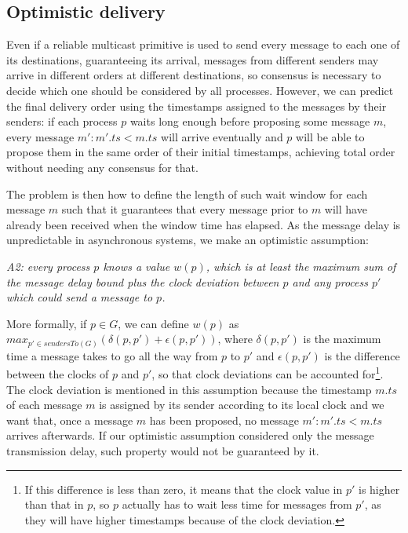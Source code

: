\documentclass[times, 10pt]{article}
\begin{document}
\subsection{Optimistic delivery}
\label{sec:optdel}

Even if a reliable multicast primitive is used to send every message to each one of its destinations, guaranteeing its arrival, messages from different senders may arrive in different orders at different destinations, so consensus is necessary to decide which one should be considered by all processes. However, we can predict the final delivery order using the timestamps assigned to the messages by their senders: if each process $p$ waits long enough before proposing some message $m$, every message $m' : m'.ts < m.ts$ will arrive eventually and $p$ will be able to propose them in the same order of their initial timestamps, achieving total order without needing any consensus for that.

The problem is then how to define the length of such wait window for each message $m$ such that it guarantees that every message prior to $m$ will have already been received when the window time has elapsed. As the message delay is unpredictable in asynchronous systems, we make an optimistic assumption:

\begin{center}
\emph{A2: every process $p$ knows a value $w(p)$, which is at least the maximum sum of the message delay bound plus the clock deviation between $p$ and any process $p'$ which could send a message to $p$.}
\end{center}

More formally, if $p \in G$, we can define $w(p)$ as $max_{p' \in sendersTo(G)}(\delta(p,p')+\epsilon(p,p'))$, where $\delta(p,p')$ is the maximum time a message takes to go all the way from $p$ to $p'$ and $\epsilon(p,p')$ is the difference between the clocks of $p$ and $p'$, so that clock deviations can be accounted for\footnote{If this difference is less than zero, it means that the clock value in $p'$ is higher than that in $p$, so $p$ actually has to wait less time for messages from $p'$, as they will have higher timestamps because of the clock deviation.}. The clock deviation is mentioned in this assumption because the timestamp $m.ts$ of each message $m$ is assigned by its sender according to its local clock and we want that, once a message $m$ has been proposed, no message $m' : m'.ts < m.ts$ arrives afterwards. If our optimistic assumption considered only the message transmission delay, such property would not be guaranteed by it.
\end{document}
